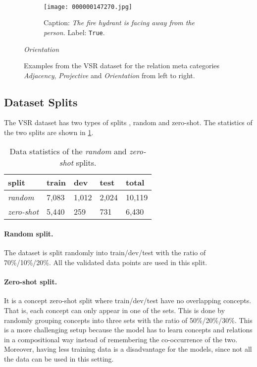 \begin{figure}[ht]
\begin{minipage}[t]{.30\textwidth}
\begin{subfigure}[t]{\textwidth}
        \end{subfigure}\\
        \begin{subfigure}[t]{\textwidth}
        \centering
        \texttt{[image: 000000147270.jpg]}
        \caption{Caption: \textit{The fire hydrant is facing away from the person.} Label: \texttt{True}.}
        \end{subfigure}%
        \caption*{\textit{Orientation}}
    \end{minipage}%
    \caption{Examples from the VSR dataset for the relation meta categories \textit{Adjacency}, \textit{Projective} and \textit{Orientation} from left to right.}
    \label{fig:vsr-examples-2}
\end{figure}

\subsection{Dataset Splits}\label{sec:vsr_splits}

The VSR dataset has two types of splits \cite{liu2022visual}, random and zero-shot. The statistics of the two splits are shown in \cref{tab:data_splits}.

\begin{table}[ht]
\small
\centering
\begin{tabular}{lllll}
\toprule
 split & train & dev & test & total   \\
\midrule
\textit{random} & 7,083 & 1,012 & 2,024 & 10,119 \\
\textit{zero-shot} & 5,440 & 259 & 731  & 6,430\\
\bottomrule
\end{tabular}
\caption{Data statistics of the \textit{random} and \textit{zero-shot} splits. }
\label{tab:data_splits}
\end{table}

\paragraph{Random split.}
The dataset is split randomly into train/dev/test with the ratio of 70\%/10\%/20\%. All the validated data points are used in this split.

\paragraph{Zero-shot split.}
It is a concept zero-shot split where train/dev/test have no overlapping concepts. That is, each concept can only appear in one of the sets.
This is done by randomly grouping concepts into three sets with the ratio of 50\%/20\%/30\%.
This is a more challenging setup because the model has to learn concepts and relations in a compositional way instead of remembering the co-occurrence of the two.
Moreover, having less training data is a disadvantage for the models, since not all the data can be used in this setting.